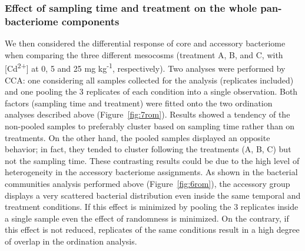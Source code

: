 \subsubsection{Effect of sampling time and treatment on the whole pan-bacteriome components}
We then considered the differential response of core and accessory bacteriome when comparing the three different mesocosms (treatment A, B, and C, with [Cd\textsuperscript{2+}] at 0, 5 and 25 mg kg\textsuperscript{-1}, respectively). Two analyses were performed by CCA: one considering all samples collected for the analysis (replicates included) and one pooling the 3 replicates of each condition into a single observation. Both factors (sampling time and treatment) were fitted onto the two ordination analyses described above (Figure~\ref{fig:7rom}). Results showed a tendency of the non-pooled samples to preferably cluster based on sampling time rather than on treatments. On the other hand, the pooled samples displayed an opposite behavior; in fact, they tended to cluster following the treatments (A, B, C) but not the sampling time. These contrasting results could be due to the high level of heterogeneity in the accessory bacteriome assignments. As shown in the bacterial communities analysis performed above (Figure~\ref{fig:6rom}), the accessory group displays a very scattered bacterial distribution even inside the same temporal and treatment conditions. If this effect is minimized by pooling the 3 replicates inside a single sample even the effect of randomness is minimized. On the contrary, if this effect is not reduced, replicates of the same conditions result in a high degree of overlap in the ordination analysis.\\
